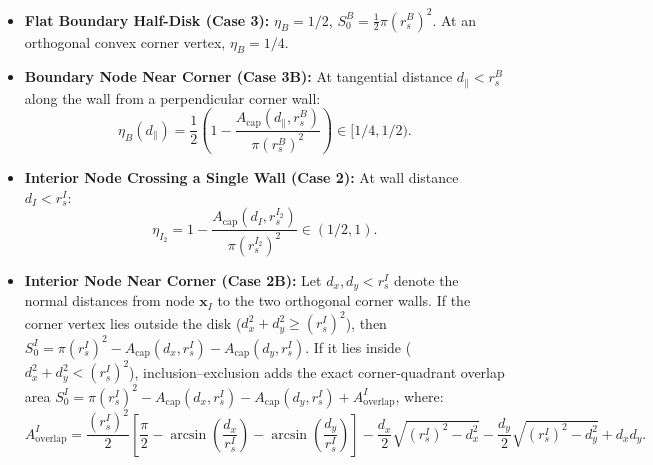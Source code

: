 \documentclass[VANCOUVER]{USG}
\begin{document}
\begin{itemize}
    \item \textbf{Flat Boundary Half-Disk (Case 3):} $\eta_B = 1/2$, $S_0^B = \frac{1}{2} \pi (r_s^B)^2$. At an orthogonal convex corner vertex, $\eta_B = 1/4$.
    \item \textbf{Boundary Node Near Corner (Case 3B):} At tangential distance $d_{\parallel} < r_s^B$ along the wall from a perpendicular corner wall:
          \begin{equation}
              \eta_B(d_{\parallel}) = \frac{1}{2} \left( 1 - \frac{A_{\mathrm{cap}}(d_{\parallel}, r_s^B)}{\pi (r_s^B)^2} \right) \in [1/4, 1/2).
              \label{eq:eta_boundary_near_corner}
          \end{equation}
    \item \textbf{Interior Node Crossing a Single Wall (Case 2):} At wall distance $d_I < r_s^I$:
          \begin{equation}
              \eta_{I_2} = 1 - \frac{A_{\mathrm{cap}}(d_I, r_s^{I_2})}{\pi (r_s^{I_2})^2} \in (1/2, 1).
              \label{eq:eta_circular_cap}
          \end{equation}
    \item \textbf{Interior Node Near Corner (Case 2B):} Let $d_x, d_y < r_s^I$ denote the normal distances from node $\mathbf{x}_I$ to the two orthogonal corner walls. If the corner vertex lies outside the disk ($d_x^2 + d_y^2 \ge (r_s^I)^2$), then $S_0^I = \pi (r_s^I)^2 - A_{\mathrm{cap}}(d_x, r_s^I) - A_{\mathrm{cap}}(d_y, r_s^I)$. If it lies inside ($d_x^2 + d_y^2 < (r_s^I)^2$), inclusion--exclusion adds the exact corner-quadrant overlap area $S_0^I = \pi (r_s^I)^2 - A_{\mathrm{cap}}(d_x, r_s^I) - A_{\mathrm{cap}}(d_y, r_s^I) + A_{\mathrm{overlap}}^I$, where:
          \begin{equation}
              A_{\mathrm{overlap}}^I = \frac{(r_s^I)^2}{2} \left[ \frac{\pi}{2} - \arcsin\left(\frac{d_x}{r_s^I}\right) - \arcsin\left(\frac{d_y}{r_s^I}\right) \right] - \frac{d_x}{2}\sqrt{(r_s^I)^2 - d_x^2} - \frac{d_y}{2}\sqrt{(r_s^I)^2 - d_y^2} + d_x d_y.
              \label{eq:corner_overlap_formula}
          \end{equation}
\end{itemize}
\end{document}
